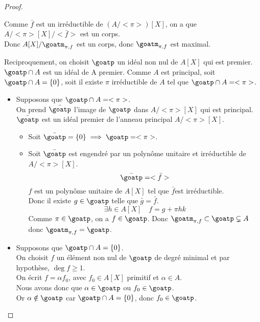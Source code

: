 \begin{proof}
\begin{itemize}
		      Comme $\bar{f}$ est un irréductible de $(A/<\pi>)[X]$, on a que $A/<\pi>[X]/<\bar{f}>$ est un corps.\\
		      Donc $A[X]/\goatm_{\pi,f}$ est un corps, donc $\goatm_{\pi,f}$ est maximal.
	\end{itemize}
	\vspace{0.25cm}
	\noindent Reciproquement, on choisit $\goatp$ un idéal non nul de $A[X]$ qui est premier. \\
	$\goatp \cap A$ est un idéal de A premier.
	Comme $A$ est principal, soit $\goatp \cap A = \{0\}$, soit il existe $\pi$ irréductible de $A$ tel que $\goatp \cap A = <\pi>$.
	\begin{itemize}
		\item Supposons que $\goatp \cap A = <\pi>$.\\
		      On prend $\bar{\goatp}$ l'image de $\goatp$ dans $A/<\pi>[X]$ qui est principal.\\
		      $\bar{\goatp}$ est un idéal premier de l'anneau principal $A/<\pi>[X]$.\\
		      \begin{itemize}
			      \item Soit $\bar{\goatp} = \{0\} \implies \goatp = <\pi>$.
			      \item Soit $\bar{\goatp}$ est engendré par un polynôme unitaire et irréductible de $A/<\pi>[X]$.
			            $$ \bar{\goatp} = <\bar{f}> $$
			            $f$ est un polynôme unitaire de $A[X]$ tel que $\bar{f}$est irréductible. \\
			            Donc il existe $g \in \goatp$ telle que $\bar{g} = \bar{f}$.
			            $$ \exists h \in A[X] \quad f = g + \pi h k$$
			            Comme $\pi \in \goatp$, on a $f \in \goatp$.
			            Donc $\goatm_{\pi,f} \subset \goatp \subsetneq A$
			            donc $\goatm_{\pi,f} = \goatp$.
		      \end{itemize}
		\item Supposons que $\goatp \cap A = \{0\}$.\\
		      On choisit $f$ un élément non nul de $\goatp$ de degré minimal et par hypothèse, $\deg f \geq 1$.\\
		      On écrit $f = \alpha f_0$, avec $f_0 \in A[X]$ primitif et $\alpha \in A$.\\
		      Nous avons donc que $\alpha \in \goatp$ ou $f_0 \in \goatp$. \\
		      Or $\alpha \notin \goatp$ car $\goatp \cap A = \{0\}$, donc $f_0 \in \goatp$.\\

\end{itemize}
\end{proof}
